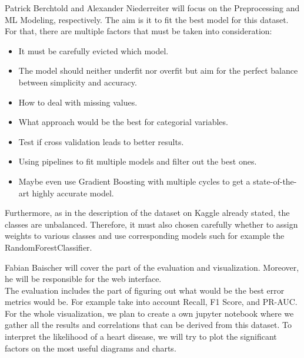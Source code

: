 \documentclass{article}
\begin{document}
Patrick Berchtold and Alexander Niederreiter will focus on the Preprocessing and ML Modeling, respectively. The aim is it to fit the best model for this dataset. For that, there are multiple factors that must be taken into consideration:
\begin{itemize}
    \item It must be carefully evicted which model. 
    \item The model should neither underfit nor overfit but aim for the perfect balance between simplicity and accuracy.
    \item How to deal with missing values.
    \item What approach would be the best for categorial variables.
    \item Test if cross validation leads to better results.
    \item Using pipelines to fit multiple models and filter out the best ones.
    \item Maybe even use Gradient Boosting with multiple cycles to get a state-of-the-art highly accurate model.
\end{itemize}

Furthermore, as in the description of the dataset on Kaggle already stated, the classes are unbalanced. Therefore, it must also chosen carefully whether to assign weights to various classes and use corresponding models such for example the RandomForestClassifier.
\vspace{1em}

Fabian Baischer will cover the part of the evaluation and visualization. Moreover, he will be responsible for the web interface.\\
The evaluation includes the part of figuring out what would be the best error metrics would be. For example take into account Recall, F1 Score, and PR-AUC.\\
For the whole visualization, we plan to create a own jupyter notebook where we gather all the results and correlations that can be derived from this dataset. To interpret the likelihood of a heart disease, we will try to plot the significant factors on the most useful diagrams and charts.
\end{document}
